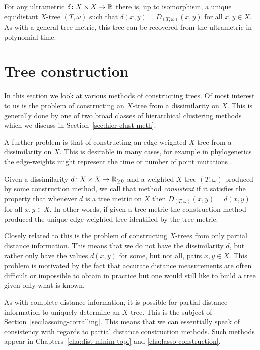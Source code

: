 For any ultrametric $\delta \colon X \times X \to {\mathbb R}$ there is, up to
isomorphism, a unique equidistant $X$-tree $(T,\omega)$ such that $\delta(x,y)
= D_{(T,\omega)}(x,y)$ for all $x,y \in X$.  As with a general tree metric,
this tree can be recovered from the ultrametric in polynomial time.

\section{Tree construction}
\label{sec:tree-construction}

In this section we look at various methods of constructing trees.  Of most
interest to us is the problem of constructing an $X$-tree from a dissimilarity
on $X$.  This is generally done by one of two broad classes of hierarchical
clustering methods which we discuss in Section~\ref{sec:hier-clust-meth}.

A further problem is that of constructing an edge-weighted $X$-tree from a
dissimilarity on $X$.  This is desirable in many cases, for example in
phylogenetics the edge-weights might represent the time or number of point
mutations \cite{felsenstein2004inferring}.

Given a dissimilarity $d \colon X \times X \to {\mathbb R}_{\geq 0}$ and a weighted
$X$-tree $(T,\omega)$ produced by some construction method, we call that
method \textit{consistent} if it satisfies the property that whenever $d$ is a
tree metric on $X$ then $D_{(T,\omega)}(x,y) = d(x,y)$ for all $x,y \in X$.
In other words, if given a tree metric the construction method produced the
unique edge-weighted tree identified by the tree metric.

Closely related to this is the problem of constructing $X$-trees from only
partial distance information.  This means that we do not have the
dissimilarity $d$, but rather only have the values $d(x,y)$ for some, but not
all, pairs $x,y \in X$.  This problem is motivated by the fact that accurate
distance measurements are often difficult or impossible to obtain in practice
but one would still like to build a tree given only what is known.

As with complete distance information, it is possible for partial distance
information to uniquely determine an $X$-tree.  This is the subject of
Section~\ref{sec:lassoing-corralling}.  This means that we can essentially
speak of consistency with regards to partial distance construction methods.
Such methods appear in Chapters~\ref{cha:dist-minim-topl} and
\ref{cha:lasso-construction}.

